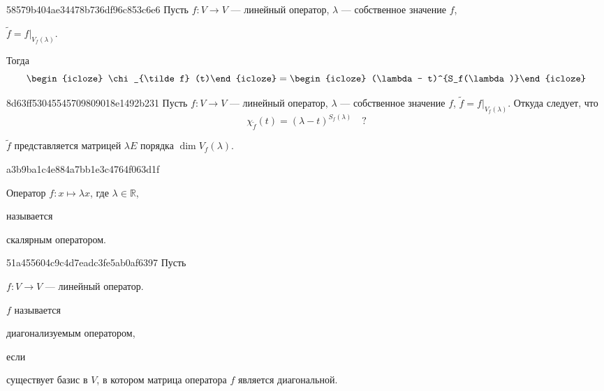 \begin{note}{58579b404ae34478b736df96c853c6e6}
    Пусть \( f : V \to V \) --- линейный оператор, \( \lambda \) --- собственное значение \( f \), \: \begin{icloze}{2}\( \tilde f = f|_{V_f(\lambda)} \).\end{icloze}
    Тогда
    \[
        \begin{icloze}{3}\chi_{\tilde f} (t)\end{icloze} = \begin{icloze}{1}(\lambda - t)^{S_f(\lambda)}\end{icloze}
    \]
\end{note}

\begin{note}{8d63ff53045545709809018e1492b231}
    Пусть \( f : V \to V \) --- линейный оператор, \( \lambda \) --- собственное значение \( f \), \: \( \tilde f = f|_{V_f(\lambda)} \).
    Откуда следует, что
    \[
        \chi_{\tilde f} (t) = (\lambda - t)^{S_f(\lambda)} \quad?
    \]

    \begin{cloze}{1}
        \( \tilde f \) представляется  матрицей \( \lambda E \) порядка \( \dim V_f(\lambda) \).
    \end{cloze}
\end{note}

\begin{note}{a3b9ba1c4e884a7bb1e3c4764f063d1f}
    \begin{icloze}{2}Оператор \( f : x \mapsto \lambda x \), где \( \lambda \in \mathbb R \),\end{icloze} называется \begin{icloze}{1}скалярным оператором.\end{icloze}
\end{note}

\begin{note}{51a455604c9c4d7eadc3fe5ab0af6397}
    Пусть \begin{icloze}{3}\( f : V \to V \) --- линейный оператор.\end{icloze}
    \( f \) называется \begin{icloze}{2}диагонализуемым оператором,\end{icloze} если \begin{icloze}{1}существует базис в \( V \), в котором матрица оператора \( f \) является диагональной.\end{icloze}
\end{note}


